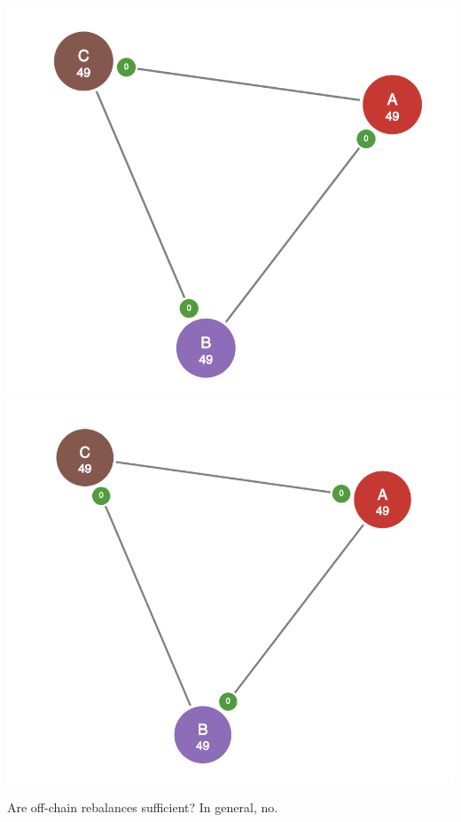 \documentclass{article}
\begin{document}
\begin{center}
\includegraphics[scale=0.4]{off-chain-rebalancing-1.png}
\includegraphics[scale=0.4]{off-chain-rebalancing-2.png}
\end{center}

Are off-chain rebalances sufficient? In general, no.


\end{document}
